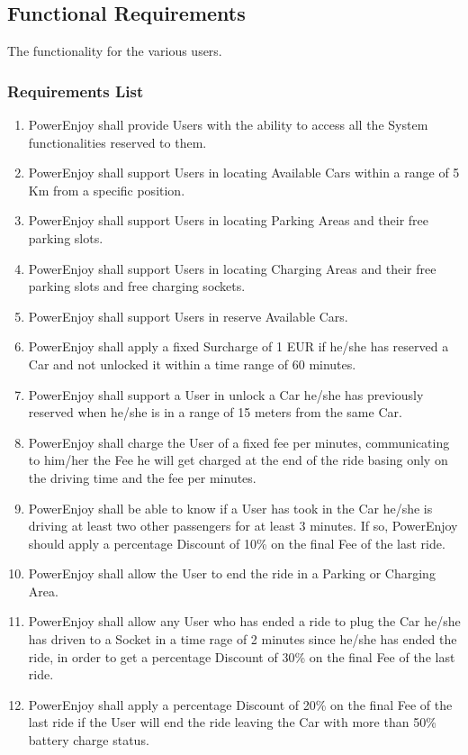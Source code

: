 \subsection{Functional Requirements}
The functionality for the various users.
\subsubsection {Requirements List}
\begin{enumerate}[label=\textbf{R\arabic*}]
\item PowerEnjoy shall provide Users with the ability to access all the System functionalities reserved to them.
\item PowerEnjoy shall support Users in locating Available Cars within a range of 5 Km from a specific position.
\item PowerEnjoy shall support Users in locating Parking Areas and their free parking slots.
\item PowerEnjoy shall support Users in locating Charging Areas and their free parking slots and free charging sockets.
\item PowerEnjoy shall support Users in reserve Available Cars.
\item PowerEnjoy shall apply a fixed Surcharge of 1 EUR if he/she has reserved a Car and not unlocked it within a time range of 60 minutes.
\item PowerEnjoy shall support a User in unlock a Car he/she has previously reserved when he/she is in a range of 15 meters from the same Car.
\item PowerEnjoy shall charge the User of a fixed fee per minutes, communicating to him/her the Fee he will get charged at the end of the ride basing only on the driving time and the fee per minutes.
\item PowerEnjoy shall be able to know if a User has took in the Car he/she is driving at least two other passengers for at least 3 minutes. If so, PowerEnjoy should apply a percentage Discount of 10\% on the final Fee of the last ride.
\item PowerEnjoy shall allow the User to end the ride in a Parking or Charging Area. 
\item PowerEnjoy shall allow any User who has ended a ride to plug the Car he/she has driven to a Socket in a time rage of 2 minutes since he/she has ended the ride, in order to get a percentage Discount of 30\% on the final Fee of the last ride.
\item PowerEnjoy shall apply a percentage Discount of 20\% on the final Fee of the last ride if the User will end the ride leaving the Car with more than 50\% battery charge status.

\end{enumerate}
